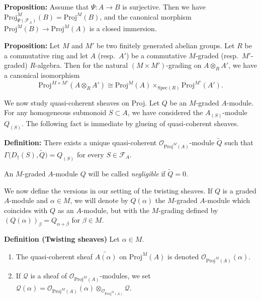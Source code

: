 \documentclass[graybox]{svmult}
\begin{document}
\vspace{0.25\baselineskip}
\noindent
\textbf{{Proposition:}}
Assume that $\Psi : A \to B$ is surjective. Then we have $\mathrm{Proj}^M_{\Psi (\mathcal{F}_A)} (B) = \mathrm{Proj}^M (B)$, and the canonical morphism
 $\mathrm{Proj}^M(B) \to \mathrm{Proj}^M(A)$
is a closed immersion.



\vspace{0.25\baselineskip}
\noindent
\textbf{{Proposition:}}
 Let $M$ and $M'$ be two finitely generated abelian groups. Let $R$ be a commutative ring and let $A$ (resp.~$A'$) be a commutative $M$-graded (resp.~$M'$-graded) $R$-algebra. 
 Then for the natural $(M \times M')$-grading on $A \otimes_R A'$, we have a canonical isomorphism
 \[
 \mathrm{Proj} ^{M \times M'} (A \otimes_R A') \cong \mathrm{Proj} ^M (A) \times_{\mathrm{Spec}(R)} \mathrm{Proj} ^{M'} (A'). 
 \]


We now study quasi-coherent sheaves on Proj.
Let $Q$ be an $M$-graded $A$-module. For any homogeneous submonoid $S \subset A$, we have considered the $A_{(S)}$-module $Q_{(S)}$. The following fact is immediate by glueing of quasi-coherent sheaves.

\vspace{0.25\baselineskip}
\noindent
\textbf{{Definition:}}
There exists 
a unique quasi-coherent $\mathcal{O}_{\mathrm{Proj}^M(A)}$-module $\widetilde{Q}$ such that
$\Gamma \bigl( D_\dag(S)  , \widetilde{Q} \bigr) = Q_{(S)}$
for every $S \in \mathcal{F}_A$.



An $M$-graded $A$-module $Q$ will be called \emph{negligible} if $\widetilde{Q}=0$.



We now define the versions in our setting of the twisting sheaves. 
If $Q$ is a graded $A$-module and $\alpha \in M$, we will denote by $Q(\alpha)$ the $M$-graded $A$-module which coincides with $Q$ as an $A$-module, but with the $M$-grading defined by $(Q(\alpha))_\beta = Q_{\alpha+\beta}$ for $\beta \in M$.


\vspace{0.25\baselineskip}
\noindent
{\textbf{Definition (Twisting sheaves)}}
Let $\alpha \in M$.
\begin{enumerate}
\item
The quasi-coherent sheaf $\widetilde{A(\alpha)}$ on $\mathrm{Proj}^M(A)$ is 
denoted $\mathcal{O}_{\mathrm{Proj}^M(A)} (\alpha)$.
\item
If $\mathcal{Q}$ is a sheaf of $\mathcal{O}_{\mathrm{Proj}^M(A)}$-modules, we set $\mathcal{Q} (\alpha) = \mathcal{O}_{\mathrm{Proj}^M(A)} (\alpha ) \otimes_{\mathcal{O}_{\mathrm{Proj}^M(A)}} \mathcal{Q}$.
\end{enumerate}
\end{document}
